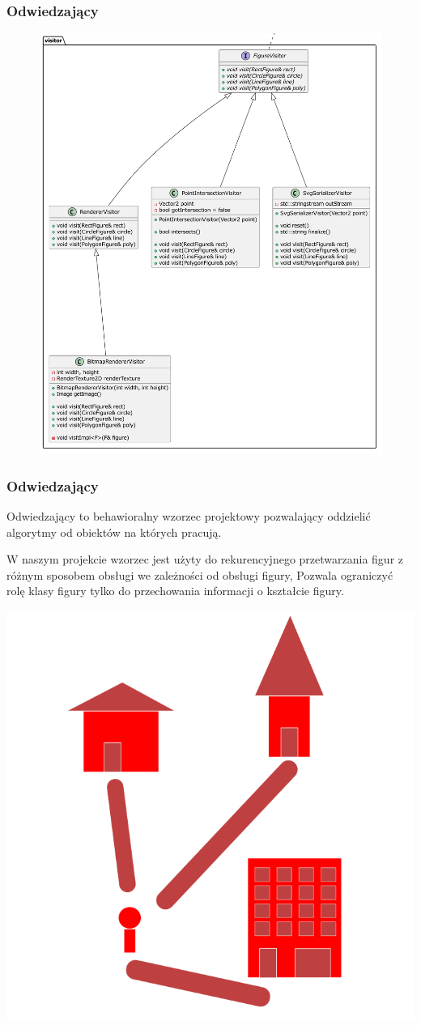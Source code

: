 \documentclass[
	11pt,]{beamer}
\begin{document}
\begin{frame}
	\frametitle{Odwiedzający}
	
	\begin{figure}
		\includegraphics[height=0.7\textheight]{figures/visitor.pdf}
	\end{figure}
\end{frame}

\begin{frame}
	\frametitle{Odwiedzający}
	Odwiedzający to behawioralny wzorzec projektowy pozwalający oddzielić algorytmy od obiektów na których pracują.
	
	\vfill
	
	W naszym projekcie wzorzec jest użyty do rekurencyjnego przetwarzania figur z różnym sposobem obsługi we zależności od obsługi figury, Pozwala ograniczyć rolę klasy figury tylko do przechowania informacji o kształcie figury.
	
	\begin{center}
    	\includegraphics[width=.25\textwidth]{figures/visitor.png}
    \end{center}
	
\end{frame}
\end{document}
